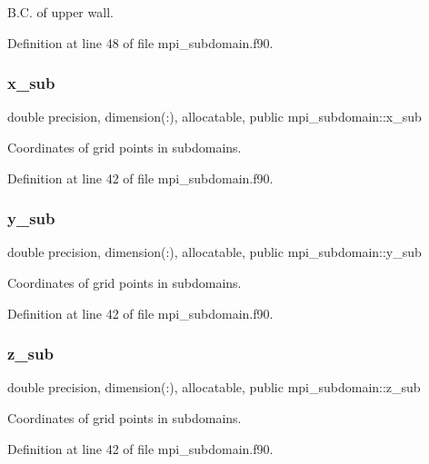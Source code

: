 B.\+C. of upper wall. 



Definition at line 48 of file mpi\+\_\+subdomain.\+f90.

\mbox{\label{namespacempi__subdomain_a978554e1520c79471ef3793ed1872b37}} 
\subsubsection{\texorpdfstring{x\_sub}{x\_sub}}
{\footnotesize\ttfamily double precision, dimension(\+:), allocatable, public mpi\+\_\+subdomain\+::x\+\_\+sub}



Coordinates of grid points in subdomains. 



Definition at line 42 of file mpi\+\_\+subdomain.\+f90.

\mbox{\label{namespacempi__subdomain_a58b09abee5f1002de7b20b1b86f5c821}} 
\subsubsection{\texorpdfstring{y\_sub}{y\_sub}}
{\footnotesize\ttfamily double precision, dimension(\+:), allocatable, public mpi\+\_\+subdomain\+::y\+\_\+sub}



Coordinates of grid points in subdomains. 



Definition at line 42 of file mpi\+\_\+subdomain.\+f90.

\mbox{\label{namespacempi__subdomain_aab6d78e49471a9a3db5ad9df4c3d4041}} 
\subsubsection{\texorpdfstring{z\_sub}{z\_sub}}
{\footnotesize\ttfamily double precision, dimension(\+:), allocatable, public mpi\+\_\+subdomain\+::z\+\_\+sub}



Coordinates of grid points in subdomains. 



Definition at line 42 of file mpi\+\_\+subdomain.\+f90.

